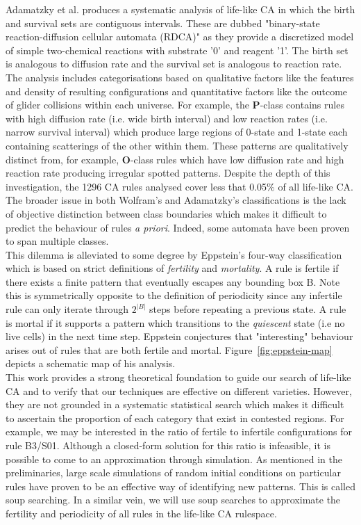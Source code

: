 Adamatzky et al.\cite{adamatzky2006phenomenology} produces a systematic analysis of life-like CA in which the birth and survival sets are contiguous intervals. These are dubbed "binary-state reaction-diffusion cellular automata (RDCA)" as they provide a discretized model of simple two-chemical reactions with substrate '0' and reagent '1'. The birth set is analogous to diffusion rate and the survival set is analogous to reaction rate. The analysis includes categorisations based on qualitative factors like the features and density of resulting configurations and quantitative factors like the outcome of glider collisions within each universe. For example, the \textbf{P}-class contains rules with high diffusion rate (i.e. wide birth interval) and low reaction rates (i.e. narrow survival interval) which produce large regions of 0-state and 1-state each containing scatterings of the other within them. These patterns are qualitatively distinct from, for example, \textbf{O}-class rules which have low diffusion rate and high reaction rate producing irregular spotted patterns. Despite the depth of this investigation, the 1296 CA rules analysed cover less that 0.05\% of all life-like CA. The broader issue in both Wolfram's and Adamatzky's classifications is the lack of objective distinction between class boundaries which makes it difficult to predict the behaviour of rules \textit{a priori}. Indeed, some automata have been proven to span multiple classes\cite{baldwin1999classi}.\\

This dilemma is alleviated to some degree by Eppstein's four-way classification\cite{eppstein2010growth} which is based on strict definitions of \textit{fertility} and \textit{mortality}. A rule is fertile if there exists a finite pattern that eventually escapes any bounding box B. Note this is symmetrically opposite to the definition of periodicity since any infertile rule can only iterate through $2^{|B|}$ steps before repeating a previous state. A rule is mortal if it supports a pattern which transitions to the \textit{quiescent} state (i.e no live cells) in the next time step. Eppstein conjectures that "interesting" behaviour arises out of rules that are both fertile and mortal. Figure~\ref{fig:eppstein-map} depicts a schematic map of his analysis.\\

This work provides a strong theoretical foundation to guide our search of life-like CA and to verify that our techniques are effective on different varieties. However, they are not grounded in a systematic statistical search which makes it difficult to ascertain the proportion of each category that exist in contested regions. For example, we may be interested in the ratio of fertile to infertile configurations for rule B3/S01. Although a closed-form solution for this ratio is infeasible, it is possible to come to an approximation through simulation. As mentioned in the preliminaries, large scale simulations of random initial conditions on particular rules have proven to be an effective way of identifying new patterns\cite{flammenkamp}. This is called soup searching. In a similar vein, we will use soup searches to approximate the fertility and periodicity of all rules in the life-like CA rulespace.

